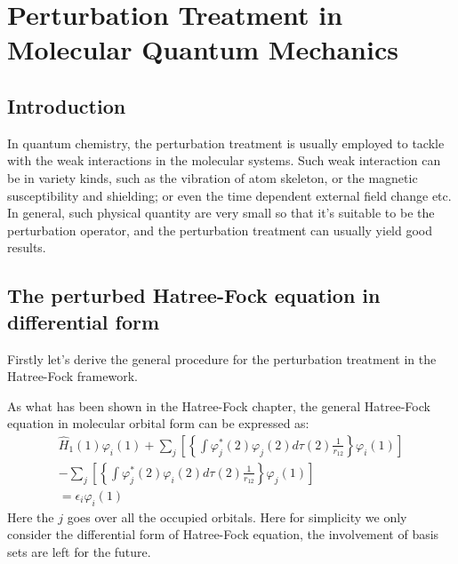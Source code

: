 %
%
%
%
%
%
\chapter{Perturbation Treatment in Molecular Quantum Mechanics}
%
%
%
%
\section{Introduction}
%
%
%
In quantum chemistry, the perturbation treatment is usually employed
to tackle with the weak interactions in the molecular systems. Such
weak interaction can be in variety kinds, such as the vibration of
atom skeleton, or the magnetic susceptibility and
shielding\cite{stevens:550}; or even the time dependent external
field change etc. In general, such physical quantity are very small
so that it's suitable to be the perturbation operator, and the
perturbation treatment can usually yield good results.

\section{The perturbed Hatree-Fock equation in differential form}
%
%
%
Firstly let's derive the general procedure for the perturbation
treatment in the Hatree-Fock framework\cite{PhysRev.118.167,
Peng_H_W, RevModPhys.32.455}.

As what has been shown in the Hatree-Fock chapter, the general
Hatree-Fock equation in molecular orbital form can be expressed as:
\begin{multline}\label{PTIMQMeq:1}
\hat{H}_{1}(1)\varphi_{i}(1) + \sum_{j}\left[
\left\{\int\varphi^{*}_{j}(2)\varphi_{j}(2)d\tau(2)\frac{1}{r_{12}}\right\}\varphi_{i}(1)
\right] \\
 -
\sum_{j}\left[
\left\{\int\varphi^{*}_{j}(2)\varphi_{i}(2)d\tau(2)\frac{1}{r_{12}}\right\}\varphi_{j}(1)
\right] \\
 = \epsilon_{i}\varphi_{i}(1)
\end{multline}
Here the $j$ goes over all the occupied orbitals. Here for
simplicity we only consider the differential form of Hatree-Fock
equation, the involvement of basis sets are left for the future.


